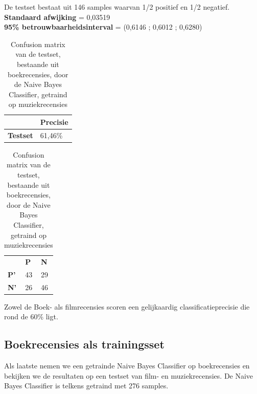 De testset bestaat uit 146 samples waarvan 1/2 positief en 1/2 negatief.\\

\textbf{Standaard afwijking} = 0,03519\\
\textbf{95\% betrouwbaarheidsinterval} = (0,6146 ; 0,6012 ; 0,6280)\\
 
\begin{table}[h]
\centering
\setlength\tabcolsep{4pt}
\begin{minipage}{0.48\textwidth}
\centering
\begin{tabular}{l|l|}
\cline{2-2}
                                            & \textbf{Precisie} \\ \hline
\multicolumn{1}{|l|}{\textbf{Testset}}      & 61,46\%           \\ \hline
\end{tabular}
\caption{Classificatieprecisie Naive Bayes Classifier, getraind op muziekrecensies, getest op boekrecensies}
\end{minipage}%
\hfill
\begin{minipage}{0.48\textwidth}
\centering
\begin{tabular}{lll}
                                 & \textbf{P}               & \textbf{N}               \\ \cline{2-3} 
\multicolumn{1}{l|}{\textbf{P'}} & \multicolumn{1}{l|}{43} & \multicolumn{1}{l|}{29} \\ \cline{2-3} 
\multicolumn{1}{l|}{\textbf{N'}} & \multicolumn{1}{l|}{26} & \multicolumn{1}{l|}{46} \\ \cline{2-3} 
\end{tabular}
\caption{Confusion matrix van de testset, bestaande uit boekrecensies, door de  Naive Bayes Classifier, getraind op muziekrecensies} 
\end{minipage}
\end{table}


Zowel de Boek- als filmrecensies scoren een gelijkaardig classificatieprecisie die rond de 60\% ligt.
\subsection{Boekrecensies als trainingsset}\label{Boekrecensies als trainingsset}

Als laatste nemen we een getrainde Naive Bayes Classifier op boekrecensies en bekijken we de resultaten op een testset van film- en muziekrecensies. De Naive Bayes Classifier is telkens getraind met 276 samples.


